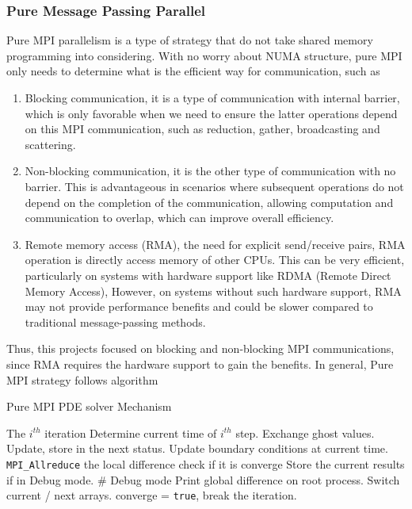 \subsubsection{Pure Message Passing Parallel} \label{SEC:PURE_MPI}
Pure MPI parallelism is a type of strategy that do not take shared memory programming into considering.
With no worry about NUMA structure, pure MPI only needs to determine what is the efficient way for communication,
such as 
\begin{enumerate}
  \item Blocking communication, it is a type of communication with internal barrier, which is only favorable when we need to ensure the latter operations depend on this MPI communication,
  such as reduction, gather, broadcasting and scattering.
  \item Non-blocking communication, it is the other type of communication with no barrier. 
  This is advantageous in scenarios where subsequent operations do not depend on the completion of the communication, 
  allowing computation and communication to overlap, which can improve overall efficiency.
  \item Remote memory access (RMA), the need for explicit send/receive pairs, RMA operation is directly access memory of other CPUs.
  This can be very efficient, particularly on systems with hardware support like RDMA (Remote Direct Memory Access), 
  However, on systems without such hardware support, 
  RMA may not provide performance benefits and could be slower compared to traditional message-passing methods.
\end{enumerate}
Thus, this projects focused on blocking and non-blocking MPI communications, since RMA requires the hardware support to gain the benefits.
In general, Pure MPI strategy follows algorithm
\begin{algorithm}
  \caption{Pure MPI PDE solver Mechanism}
  \label{ALG:PURE_MPI}
  \begin{algorithmic}[1]
    \STATE The $i^{th}$ iteration 
    \STATE Determine current time of $i^{th}$ step.
    \STATE Exchange ghost values.
    \STATE Update, store in the next status.
    \STATE Update boundary conditions at current time.
    \STATE \texttt{MPI\_Allreduce} the local difference check if it is converge
      \STATE Store the current results if in Debug mode.  \hfill \# Debug mode
      \STATE Print global difference on root process.
    \ENDIF
    \STATE Switch current / next arrays.
      \STATE converge = \texttt{true}, break the iteration.
    \ENDIF
  \end{algorithmic}
\end{algorithm}
